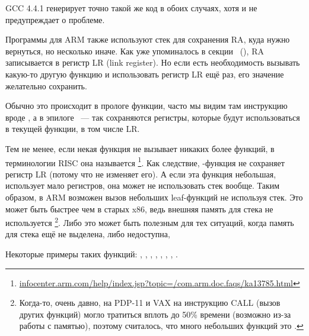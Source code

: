 GCC 4.4.1 генерирует точно такой же код в обоих случаях, хотя и не предупреждает о проблеме.


Программы для ARM также используют стек для сохранения \ac{RA}, куда нужно вернуться, но несколько иначе.
Как уже упоминалось в секции \q{\HelloWorldSectionName}~(),
\ac{RA} записывается в регистр \ac{LR} (\gls{link register}).
Но если есть необходимость вызывать какую-то другую функцию и использовать регистр \ac{LR} ещё
раз, его значение желательно сохранить.

Обычно это происходит в прологе функции, часто мы видим там инструкцию вроде , а в эпилоге
~--- так сохраняются регистры, которые будут использоваться в текущей функции, в том числе \ac{LR}.

Тем не менее, если некая функция не вызывает никаких более функций, в терминологии \ac{RISC} она называется
\footnote{\href{http://go.yurichev.com/17064}{infocenter.arm.com/help/index.jsp?topic=/com.arm.doc.faqs/ka13785.html}}. 
Как следствие, -функция не сохраняет регистр \ac{LR} (потому что не изменяет его).
А если эта функция небольшая, использует мало регистров, она может не использовать стек вообще.
Таким образом, в ARM возможен вызов небольших leaf-функций не используя стек.
Это может быть быстрее чем в старых x86, ведь внешняя память для стека не используется
\footnote{Когда-то, очень давно, на PDP-11 и VAX на инструкцию CALL (вызов других функций) могло тратиться
вплоть до 50\% времени (возможно из-за работы с памятью),
поэтому считалось, что много небольших функций это 
.}.
Либо это может быть полезным для тех ситуаций, когда память для стека ещё не выделена, либо недоступна,

Некоторые примеры таких функций:
, , 
, , ,
, , .

